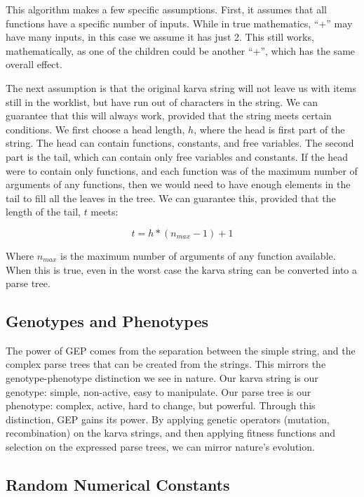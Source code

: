 \documentclass[a4paper,11pt]{report}
\begin{document}
This algorithm makes a few specific assumptions. First, it assumes that all functions have a specific number of 
inputs. While in true mathematics, ``+'' may have many inputs, in this case we assume it has just 2. This still 
works, mathematically, as one of the children could be another ``+'', which has the same overall effect. 

The next assumption is that the original karva string will not leave us with items still in the worklist, but have run out  
of characters in the string. We can guarantee that this will always work, provided that the string meets certain conditions. 
We first choose a head length, $h$, where the head is first part of the string. The head can contain functions, 
constants, and free variables. The second part is the tail, which can contain only free variables and constants. 
If the head were to contain only functions, and each function was of the maximum number of arguments of any functions, 
then we would need to have enough elements in the tail to fill all the leaves in the tree. We can guarantee this, 
provided that the length of the tail, $t$ meets:

\[ t = h * (n_{max} - 1) + 1 \]

Where $n_{max}$ is the maximum number of arguments of any function available. When this is true, even in the worst 
case the karva string can be converted into a parse tree. 

\subsection{Genotypes and Phenotypes}
The power of GEP comes from the separation between the simple string, and the complex parse trees that 
can be created from the strings. This mirrors the genotype-phenotype distinction we see in nature. Our 
karva string is our genotype: simple, non-active, easy to manipulate. Our parse tree is our phenotype: 
complex, active, hard to change, but powerful. Through this distinction, GEP gains its power.
By applying genetic operators (mutation, recombination) on the karva strings, and then applying 
fitness functions and selection on the expressed parse trees, we can mirror nature's evolution. 

\subsection{Random Numerical Constants}
\end{document}
